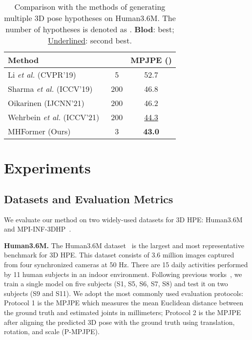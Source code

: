 \documentclass[10pt,twocolumn,letterpaper]{article}
\def\VspaceL{\vspace{-0.40cm}}
\begin{document}
\begin{table}[tb]
  \centering  
  \footnotesize
  \caption
  {
    Comparison with the methods of generating multiple 3D pose hypotheses on Human3.6M. 
    The number of hypotheses is denoted as . 
    \textbf{Blod}: best; 
    \underline{Underlined}: second best. 
  }
  \setlength{\tabcolsep}{4.20mm}  
  \begin{tabular}{lcc}
  \toprule [1pt]
  Method & &MPJPE () \\
  \midrule  [0.5pt]
  Li \emph{et al.} (CVPR'19)~\cite{li2019generating} &5 &52.7 \\
  Sharma \emph{et al.} (ICCV'19)~\cite{sharma2019monocular} &200 &46.8 \\
  Oikarinen (IJCNN'21)~\cite{oikarinen2021graphmdn} &200 &46.2 \\
  Wehrbein \emph{et al.} (ICCV'21)~\cite{wehrbein2021probabilistic} &200 &\underline{44.3} \\
  \midrule
  MHFormer (Ours) &3 &\textbf{43.0} \\
  \toprule [1pt]
  \end{tabular}
  \label{table:hypotheses}
  \VspaceL
\end{table}

\section{Experiments}
\subsection{Datasets and Evaluation Metrics}
We evaluate our method on two widely-used datasets for 3D HPE: Human3.6M~\cite{ionescu2013human3} and MPI-INF-3DHP~\cite{mehta2017monocular}. 

\noindent \textbf{Human3.6M.}
The Human3.6M dataset~\cite{ionescu2013human3} is the largest and most representative benchmark for 3D HPE. 
This dataset consists of 3.6 million images captured from four synchronized cameras at 50 Hz. 
There are 15 daily activities performed by 11 human subjects in an indoor environment. 
Following previous works~\cite{pavllo20193d,liu2020attention,wang2020motion,chen2021anatomy}, we train a single model on five subjects (S1, S5, S6, S7, S8) and test it on two subjects (S9 and S11). 
We adopt the most commonly used evaluation protocols: 
Protocol 1 is the MPJPE which measures the mean Euclidean distance between the ground truth and estimated joints in millimeters; 
Protocol 2 is the MPJPE after aligning the predicted 3D pose with the ground truth using translation, rotation, and scale (P-MPJPE). 
\end{document}

